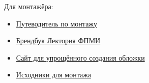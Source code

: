 Для монтажёра:
\begin{itemize}[topsep=1.5\parskip, itemsep=0.5\parskip]

  \item \hypertarget{montage-guide}{\href{https://drive.stfpmi.ru/s/CmgdvgGp57bGMR5}{Путеводитель по монтажу}}

  \item \hypertarget{brandbook}{\href{https://drive.stfpmi.ru/s/sg5sdqKmN7cMDne}{Брендбук Лектория ФПМИ}}

  \item \hypertarget{cover-creation-site}{\href{https://lectory.stfpmi.ru/previews/}{Сайт для упрощённого создания обложки}}

  \item \hypertarget{video-sources}{\href{https://drive.stfpmi.ru/s/T0DyP4lz68gSMUn}{Исходники для монтажа}}
\end{itemize}
